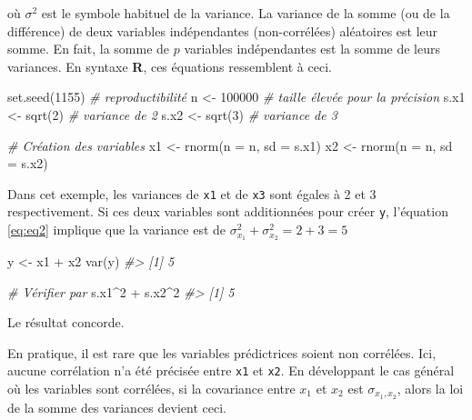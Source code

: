 \documentclass[
]{book}
\newenvironment{Shaded}{}{}
\newcommand{\AttributeTok}[1]{#1}
\newcommand{\CommentTok}[1]{\textit{#1}}
\newcommand{\DecValTok}[1]{#1}
\newcommand{\FunctionTok}[1]{#1}
\newcommand{\NormalTok}[1]{#1}
\newcommand{\OtherTok}[1]{#1}
\newcommand{\SpecialCharTok}[1]{#1}
\begin{document}
où \(\sigma^2\) est le symbole habituel de la variance. La variance de la somme (ou de la différence) de deux variables indépendantes (non-corrélées) aléatoires est leur somme. En fait, la somme de \(p\) variables indépendantes est la somme de leurs variances. En syntaxe \textbf{R}, ces équations ressemblent à ceci.

\begin{Shaded}
\begin{Highlighting}[]
\FunctionTok{set.seed}\NormalTok{(}\DecValTok{1155}\NormalTok{)                  }\CommentTok{\# reproductibilité}
\NormalTok{n }\OtherTok{\textless{}{-}} \DecValTok{100000}                      \CommentTok{\# taille élevée pour la précision}
\NormalTok{s.x1 }\OtherTok{\textless{}{-}} \FunctionTok{sqrt}\NormalTok{(}\DecValTok{2}\NormalTok{)                  }\CommentTok{\# variance de 2 }
\NormalTok{s.x2 }\OtherTok{\textless{}{-}} \FunctionTok{sqrt}\NormalTok{(}\DecValTok{3}\NormalTok{)                  }\CommentTok{\# variance de 3}

\CommentTok{\# Création des variables}
\NormalTok{x1 }\OtherTok{\textless{}{-}} \FunctionTok{rnorm}\NormalTok{(}\AttributeTok{n =}\NormalTok{ n, }\AttributeTok{sd =}\NormalTok{ s.x1) }
\NormalTok{x2 }\OtherTok{\textless{}{-}} \FunctionTok{rnorm}\NormalTok{(}\AttributeTok{n =}\NormalTok{ n, }\AttributeTok{sd =}\NormalTok{ s.x2)     }
\end{Highlighting}
\end{Shaded}

Dans cet exemple, les variances de \texttt{x1} et de \texttt{x3} sont égales à 2 et 3 respectivement. Si ces deux variables sont additionnées pour créer \texttt{y}, l'équation \eqref{eq:eq2} implique que la variance est de \(\sigma^2_{x_{1}} + \sigma^2_{x_2} = 2 + 3= 5\)

\begin{Shaded}
\begin{Highlighting}[]
\NormalTok{y }\OtherTok{\textless{}{-}}\NormalTok{ x1 }\SpecialCharTok{+}\NormalTok{ x2}
\FunctionTok{var}\NormalTok{(y)}
\CommentTok{\#\textgreater{} [1] 5}

\CommentTok{\# Vérifier par}
\NormalTok{s.x1}\SpecialCharTok{\^{}}\DecValTok{2} \SpecialCharTok{+}\NormalTok{ s.x2}\SpecialCharTok{\^{}}\DecValTok{2}
\CommentTok{\#\textgreater{} [1] 5}
\end{Highlighting}
\end{Shaded}

Le résultat concorde.

En pratique, il est rare que les variables prédictrices soient non corrélées. Ici, aucune corrélation n'a été précisée entre \texttt{x1} et \texttt{x2}. En développant le cas général où les variables sont corrélées, si la covariance entre \(x_1\) et \(x_2\) est \(\sigma_{x_1,x_2}\), alors la loi de la somme des variances devient ceci.
\end{document}

